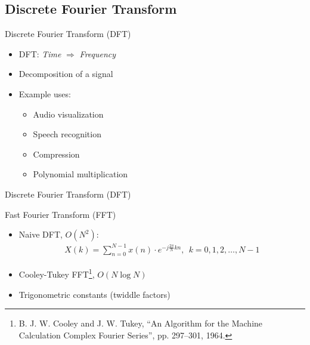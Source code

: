\documentclass[xcolor={table}]{beamer}
\begin{document}
\subsection{Discrete Fourier Transform}
\begin{frame}{Discrete Fourier Transform (DFT)}
    \begin{itemize}
        \item DFT: \textit{Time} $\Rightarrow$ \textit{Frequency}
        \item Decomposition of a signal
        \item Example uses:
            \begin{itemize}
                \item Audio visualization
                \item Speech recognition
                \item Compression
                \item Polynomial multiplication
            \end{itemize}
    \end{itemize}

\end{frame}

\begin{frame}{Discrete Fourier Transform (DFT)}
    
\end{frame}

\begin{frame}{Fast Fourier Transform (FFT)}
    \begin{itemize}
        \item Naive DFT, $O(N^2)$:
            \begin{align*}
                X\left(k\right) = \sum\limits_{n=0}^{N-1}x\left(n\right)\cdot e^{-j\frac{2\pi}{N}kn},\ \ k = 0,1,2,\dots,N-1
            \end{align*}
        \item Cooley-Tukey FFT\footnote{B. J. W. Cooley and J. W. Tukey, \enquote{An Algorithm for the Machine Calculation Complex Fourier Series}, pp. 297–301, 1964.}, $O(N\log{}N)$
        \item Trigonometric constants (twiddle factors)
    \end{itemize}
\end{frame}
%     
\end{document}
